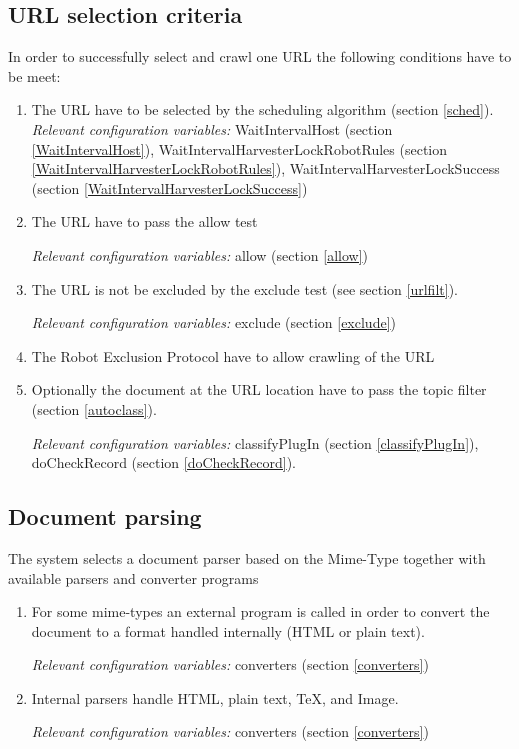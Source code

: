 \subsection{URL selection criteria}
In order to successfully select and crawl one URL the following conditions
have to be meet:
\begin{enumerate}
\item The URL have to be selected by the scheduling algorithm (section
\ref{sched}).\\

{\em Relevant configuration variables:}
WaitIntervalHost (section \ref{WaitIntervalHost}),
WaitIntervalHarvesterLockRobotRules (section \ref{WaitIntervalHarvesterLockRobotRules}),
WaitIntervalHarvesterLockSuccess (section \ref{WaitIntervalHarvesterLockSuccess})

\item The URL have to pass the allow test

{\em Relevant configuration variables:} allow (section \ref{allow})

\item The URL is not be excluded by the exclude test (see section
\ref{urlfilt}).

{\em Relevant configuration variables:} exclude (section \ref{exclude})

\item The Robot Exclusion Protocol have to allow crawling of the URL

\item Optionally the document at the URL location have to pass the topic filter
(section \ref{autoclass}).


{\em Relevant configuration variables:}
classifyPlugIn (section \ref{classifyPlugIn}),
doCheckRecord (section \ref{doCheckRecord}).

\end{enumerate}

\subsection{Document parsing}

The system selects a document parser based on the Mime-Type together
with available parsers and converter programs
\begin{enumerate}
\item For some mime-types an external program
is called in order to convert the document to a format handled internally (HTML or plain text).

{\em Relevant configuration variables:} converters (section \ref{converters})

\item Internal parsers handle HTML, plain text, TeX, and Image.

{\em Relevant configuration variables:} converters (section \ref{converters})

\end{enumerate}

